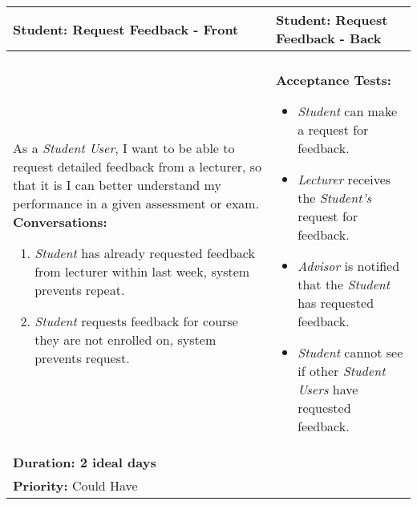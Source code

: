\documentclass[11pt]{article}
\begin{document}
\begin{center}
\begin{tabular}{ | m{8cm}  |  m{8cm}  | } 
 \hline
 \textbf{Student: Request Feedback - Front} &  \textbf{Student: Request Feedback - Back}  \\ 
  \hline
&\\[5pt]
As a \emph{Student User}, I want to be able to request detailed feedback from a lecturer, so that it is I can better understand my performance in a given assessment or exam.
\newline
\textbf{Conversations:}
\begin{enumerate}
\item{\emph{Student} has already requested feedback from lecturer within last week, system prevents repeat.}
\item{\emph{Student} requests feedback for course they are not enrolled on, system prevents request. }
\end{enumerate}
& \textbf{Acceptance Tests:} 
\begin{itemize}
\item{\emph{Student} can make a request for feedback.}
\item{\emph{Lecturer} receives the \emph{Student's} request for feedback.}
\item{\emph{Advisor} is notified that the \emph{Student} has requested feedback.}
\item{\emph{Student} cannot see if other \emph{Student Users} have requested feedback.} 
\end{itemize} \\
\textbf{Duration: 2 ideal days} &\\
\textbf{Priority:}  \textcolor{dkgreen}{Could Have} & \\
 \hline
\end{tabular}
\end{center}
\end{document}
